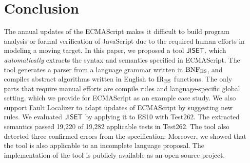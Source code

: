 \section{Conclusion}\label{sec:conclude}
The annual updates of the ECMAScript makes it difficult to
build program analysis or formal verification of JavaScript due to the
required human efforts in modeling a moving target.  In this paper,
we proposed a tool \( \text{\sf JISET} \), which \textit{automatically} extracts the
syntax and semantics specified in ECMAScript.  The tool
generates a parser from a language grammar written in \( \text{BNF}_{\text{ES}} \), and
compiles abstract algorithms written in English to \( \text{IR}_\text{ES} \) functions.
The only parts that require manual efforts are compile rules and
language-specific global setting, which we provide for ECMAScript
as an example case study.  We also support \textsf{Fault Localizer} to
adapt updates of ECMAScript by suggesting new rules.
We evaluated \( \text{\sf JISET} \) by applying it to ES10 with Test262.
The extracted semantics passed 19,220 of 19,282 applicable tests in Test262.
The tool also detected three confirmed errors from the specification.
Moreover, we showed that the tool is also applicable to an incomplete
language proposal. The implementation of the tool is publicly available
as an open-source project.

